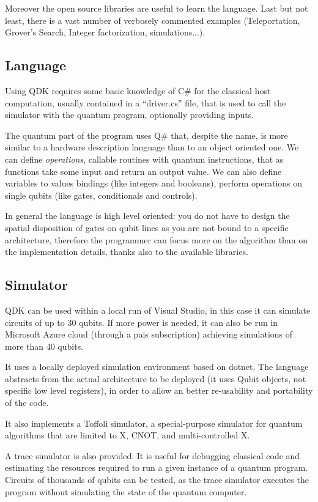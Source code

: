 Moreover the open source libraries are useful to learn the language. Last but not least, there is a vast number of verbosely commented examples (Teleportation, Grover's Search, Integer factorization, simulations...).

\subsection{Language}

Using QDK requires some basic knowledge of C\# for the classical host computation, usually contained in a ``driver.cs'' file, that is used to call the simulator with the quantum program, optionally providing inputs.

The quantum part of the program uses Q\# that, despite the name, is more similar to a hardware description language than to an object oriented one. We can define \textit{operations}, callable routines with quantum instructions, that as functions take some input and return an output value. We can also define variables to values bindings (like integers and booleans), perform operations on single qubits (like gates, conditionals and controls).

In general the language is high level oriented: you do not have to design the spatial disposition of gates on qubit lines as you are not bound to a specific architecture, therefore the programmer can focus more on the algorithm than on the implementation details, thanks also to the available libraries.

\subsection{Simulator}

QDK can be used within a local run of Visual Studio, in this case it can simulate circuits of up to 30 qubits. If more power is needed, it can also be run in Microsoft Azure cloud (through a pais subscription) achieving simulations of more than 40 qubits.

It uses a locally deployed simulation environment based on dotnet. The language abstracts from the actual architecture to be deployed (it uses Qubit objects, not specific low level registers), in order to allow an better re-usability and portability of the code.

It also implements a Toffoli simulator, a special-purpose simulator for quantum algorithms that are limited to X, CNOT, and multi-controlled X.

A trace simulator is also provided. It is useful for debugging classical code and estimating the resources required to run a given instance of a quantum program. Circuits of thousands of qubits can be tested, as the trace simulator executes the program without simulating the state of the quantum computer.

